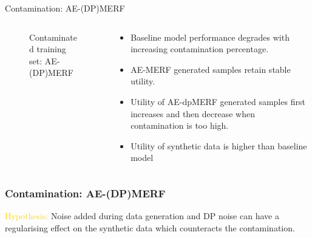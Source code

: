 \begin{frame}{Contamination: AE-(DP)MERF}
    \begin{columns}
        \begin{column}{0.65\textwidth}
            \begin{figure}

                \centering
        
                \caption{Contaminated training set: AE-(DP)MERF}
        
            \end{figure}
        \end{column}
        \begin{column}{0.34\textwidth}
            \begin{itemize}
                \scriptsize
                \item<2-> \alert{Baseline model} performance degrades with increasing contamination percentage.
                \item<3-> \alert{AE-MERF} generated samples retain stable utility.
                \item<4-> Utility of \alert{AE-dpMERF} generated samples first increases and then decrease when contamination is too high.
                \item<5-> Utility of synthetic data is higher than baseline model    
            \end{itemize}
        \end{column}
    \end{columns}
    
\end{frame}

\begin{frame}
    \frametitle{Contamination: AE-(DP)MERF}

    \textcolor{gold}{Hypothesis: } Noise added during data generation and DP noise can have a \alert{regularising effect} on the synthetic data which counteracts the contamination.

\end{frame}

